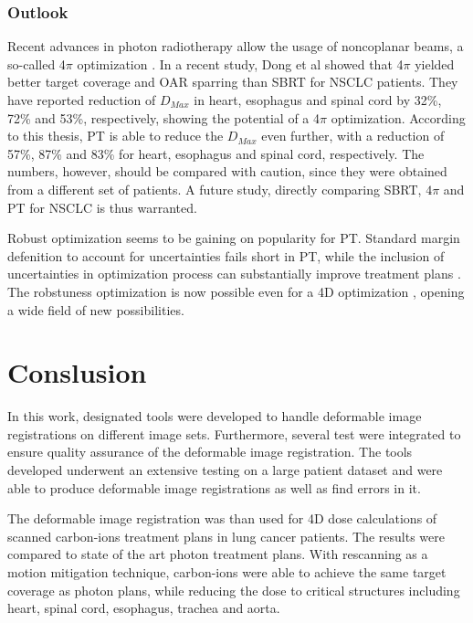 \documentclass[type=dr, dr=rernat, accentcolor=tud7b,colorbacktitle, bigchapter, openright, twoside, 12pt ]{tudthesis}
\begin{document}
\subsection{Outlook}

Recent advances in photon radiotherapy allow the usage of noncoplanar beams, a so-called 4$\pi$ optimization \cite{Dong2013}. In a recent study, Dong et al \cite{Dong2013b} showed that
4$\pi$ yielded better target coverage and OAR sparring than SBRT for NSCLC patients. 
They have reported reduction of $D_{Max}$ in heart, esophagus and spinal cord by 32\%, 72\% and 53\%, respectively, showing
the potential of a 4$\pi$ optimization. According to this thesis, PT is able to reduce the $D_{Max}$ even further, with a reduction of 57\%, 87\% and 83\% for heart, esophagus and spinal cord,
respectively. The numbers, however, should be compared with caution, since they were obtained from a different set of patients. 
A future study, directly comparing SBRT, $4\pi$ and PT for NSCLC is thus warranted.

Robust optimization seems to be gaining on popularity for PT. Standard margin defenition to account for uncertainties fails short in PT, while the inclusion of uncertainties in 
optimization process can substantially improve treatment plans \cite{Chen2012}. The robstuness optimization is now possible even for a 4D optimization \cite{Liu2016}, opening a wide
field of new possibilities. 
\newpage

\chapter{Conslusion}

In this work, designated tools were developed to handle deformable image registrations on different image sets. Furthermore, several test were 
integrated to ensure quality assurance of the deformable image registration. The tools developed underwent an extensive testing on a large patient dataset
and were able to produce deformable image registrations as well as find errors in it.

The deformable image registration was than used for 4D dose calculations of scanned carbon-ions treatment plans in lung cancer patients. The results were compared
to state of the art photon treatment plans. With rescanning as a motion mitigation technique, carbon-ions were able to achieve the same target coverage as
photon plans, while reducing the dose to critical structures including heart, spinal cord, esophagus, trachea and aorta.
\end{document}
